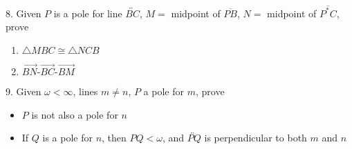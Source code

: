 \documentclass{report}
\begin{document}
    \bigbreak \noindent 
    \begin{mdframed}
        8. Given $P$ is a pole for line $\overleftrightarrow{BC}$, $M =$ midpoint of $\overline{PB}$, $N =$ midpoint of $\overline{P^{*}C}$, prove
        \begin{enumerate}[label=(\alph*)]
            \item $\triangle MBC  \cong \triangle NCB$
            \item $ \overrightarrow{BN}\text{-}\overrightarrow{BC}\text{-}\overrightarrow{BM} $
        \end{enumerate}
    \end{mdframed}

    \bigbreak \noindent 
    \begin{mdframed}
        9. Given $\omega < \infty$, lines $m\ne n$, $P$ a pole for $m$, prove
        \begin{itemize}
            \item $P$ is not also a pole for $n$
            \item If $Q $ is a pole for $n$, then $PQ < \omega$, and $\overleftrightarrow{PQ}$ is perpendicular to both $m$ and $n$
        \end{itemize}
    \end{mdframed}






    
\end{document}
